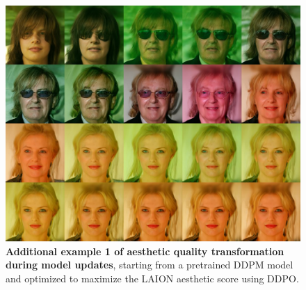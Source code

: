 \begin{appendixs}
        \begin{figure}
            \centering
            \includegraphics[scale=1.40]{img/results/laion_1.png}
            \vspace{-0pt}  %
            \captionsetup{width=\textwidth} %
            \caption{\textbf{Additional example 1 of aesthetic quality transformation during model updates}, starting from a pretrained DDPM model and optimized to maximize the LAION aesthetic score using DDPO.}
            \label{fig:ddpm-to-ddpo-aesthetic-extra1}
        \end{figure}



\end{appendixs}
